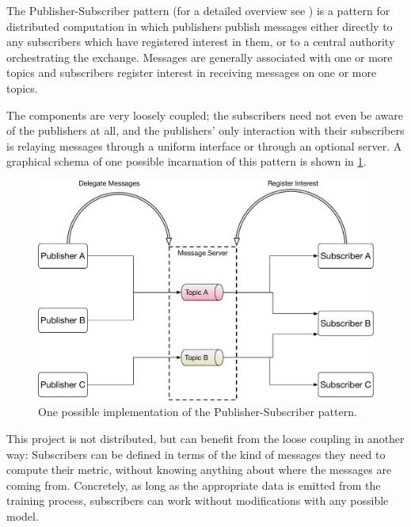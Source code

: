 The Publisher-Subscriber pattern (for a detailed overview see
\cite{eugster2003}) is a pattern for distributed computation in which publishers
publish messages either directly to any subscribers which have registered
interest in them, or to a central authority orchestrating the exchange. Messages
are generally associated with one or more topics and subscribers register
interest in receiving messages on one or more topics.

The components are very loosely coupled; the subscribers need not even
be aware of the publishers at all, and the publishers' only interaction
with their subscribers is relaying messages through a uniform interface
or through an optional server. A graphical schema of one possible
incarnation of this pattern is shown in \cref{fig:pubsub}.

\begin{figure}
    \hypertarget{fig:pubsub}{%
        \centering
        \includegraphics[max width=\textwidth]{gfx/diagrams/architecture_diagrams/pubsub.pdf}
        \caption{One possible implementation of the Publisher-Subscriber pattern.}\label{fig:pubsub}
    }
\end{figure}

This project is not distributed, but can benefit from the loose coupling
in another way: Subscribers can be defined in terms of the kind of
messages they need to compute their metric, without knowing anything
about where the messages are coming from. Concretely, as long as the
appropriate data is emitted from the training process, subscribers can
work without modifications with any possible model.

